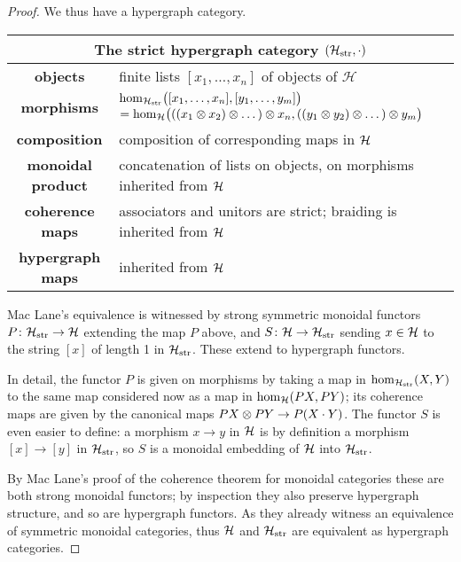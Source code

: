 \begin{proof}
  We thus have a hypergraph category.
  \begin{center}
    \begin{tabular}{| c | p{} |}
      \hline
      \multicolumn{2}{|c|}{The strict hypergraph category $(\mathcal H_{\mathrm{str}},
      \cdot)$} \\
      \hline
      \textbf{objects} & finite lists $[x_1, \dots, x_n]$ of objects of
      $\mathcal H$ \\ 
      \textbf{morphisms} & $\mathrm{hom}_{\mathcal H_{\mathrm{str}}}\big([x_1, \dots,
      x_n],[y_1, \dots, y_m]\big)$ \newline $= \mathrm{hom}_{\mathcal H}\big(((x_1 \otimes x_2) \otimes
      \dots) \otimes x_n, ((y_1 \otimes y_2) \otimes \dots) \otimes y_m\big)$\\ 
      \textbf{composition} & composition of corresponding maps in $\mathcal H$ \\
      \textbf{monoidal product} & concatenation of lists on objects, on
      morphisms inherited from $\mathcal H$ \\
      \textbf{coherence maps} & associators and unitors are strict; braiding is
      inherited from $\mathcal H$\\
      \textbf{hypergraph maps} & inherited from $\mathcal H$ \\
      \hline
    \end{tabular}
  \end{center}

  Mac Lane's equivalence is witnessed by strong symmetric monoidal functors
  $P{\colon} \mathcal H_{\mathrm{str}} \to \mathcal H$ extending the map $P$ above, and
  $S{\colon} \mathcal H \to \mathcal H_{\mathrm{str}}$ sending $x \in \mathcal H$ to the string
  $[x]$ of length 1 in $\mathcal H_{\mathrm{str}}$. These extend to hypergraph
  functors.

  In detail, the functor $P$ is given on morphisms by taking a map in
  $\mathrm{hom}_{\mathcal H_{\mathrm{str}}}(X,Y)$ to the same map considered now as a
  map in $\mathrm{hom}_{\mathcal H}(PX,PY)$; its coherence maps are given by the
  canonical maps $PX \otimes PY \to P(X\cdot Y)$. The functor $S$ is even easier to
  define: a morphism $x \to y$ in $\mathcal H$ is by definition a morphism $[x] \to
  [y]$ in $\mathcal H_{\mathrm{str}}$, so $S$ is a monoidal embedding of $\mathcal H$ into
  $\mathcal H_{\mathrm{str}}$. 
  
  By Mac Lane's proof of the coherence theorem for monoidal categories these are
  both strong monoidal functors; by inspection they also preserve hypergraph
  structure, and so are hypergraph functors.  As they already witness an
  equivalence of symmetric monoidal categories, thus $\mathcal H$ and $\mathcal
  H_{\mathrm{str}}$ are equivalent as hypergraph categories.
\end{proof}



